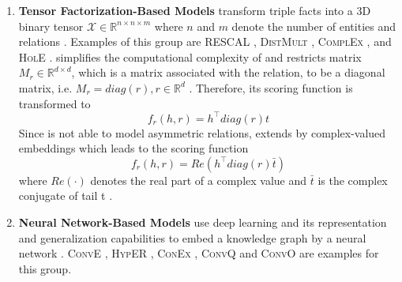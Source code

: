 \begin{enumerate}
    \item 
    \textbf{Tensor Factorization-Based Models} transform triple facts into a 3D binary tensor $\mathcal{X} \in \mathbb{R}^{n \times n \times m}$ where $n$ and $m$ denote the number of entities and relations \cite{electronics9050750}.
    Examples of this group are \textsc{RESCAL} \cite{RESCAL}, \textsc{DistMult} \cite{DistMult}, \textsc{ComplEx} \cite{ComplEx}, and \textsc{HolE} \cite{HolE}.
    \distmult simplifies the computational complexity of \rescal and restricts matrix $M_r \in \mathbb{R}^{d \times d}$, which is a matrix associated with the relation, to be a diagonal matrix, i.e. $M_r = diag(r), r \in \mathbb{R}^d$ \cite{electronics9050750}. 
    Therefore, its scoring function is transformed to
    \begin{equation}
        f_r(h,r) = h^{\top}diag(r)t\label{eq:distmultscoringfunction}
    \end{equation}
    Since \distmult is not able to model asymmetric relations, \complex \cite{ComplEx} extends \distmult by complex-valued embeddings \cite{electronics9050750} which leads to the scoring function
    \begin{equation}
        f_r(h,r) = Re(h^{\top}diag(r)\bar{t})
        \label{eq:complexscoringfunction}
    \end{equation}
    where $Re(\cdot)$ denotes the real part of a complex value and $\bar{t}$ is the complex conjugate of tail t \cite{electronics9050750}.
    
    \item 
    \textbf{Neural Network-Based Models} use deep learning and its representation and generalization capabilities to embed a knowledge graph by a neural network \cite{electronics9050750}.
    \textsc{ConvE} \cite{ConvE}, \textsc{HypER} \cite{HypER}, \textsc{ConEx} \cite{ConEx}, \textsc{ConvQ} and  \textsc{ConvO} \cite{demir2021convolutional} are examples for this group.
    
\end{enumerate}